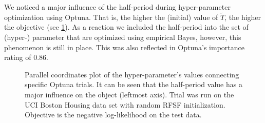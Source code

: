 We noticed a major influence of the half-period during hyper-parameter optimization using Optuna\cite{akibaOptunaNextgenerationHyperparameter2019}.
That is, the higher the (initial) value of \(\tilde{T}\), the higher the objective (see \cref{fig:optunaParallelCoordinates}).
As a reaction we included the half-period into the set of (hyper-) parameter that are optimized using empirical Bayes, however, this phenomenon is still in place.
This was also reflected in Optuna's importance rating of \num{0.86}.

\begin{figure}
	\centering
	\resizebox{\linewidth}{!}{}
	\caption{
		Parallel coordinates plot of the hyper-parameter's values connecting specific Optuna\cite{akibaOptunaNextgenerationHyperparameter2019} trials.
		It can be seen that the half-period value has a major influence on the object (leftmost axis).
		Trial was run on the UCI\cite{duaUCIMachineLearning2017} Boston Housing data set with random \ac{RFSF} initialization.
		Objective is the negative log-likelihood on the test data.
	}
	\label{fig:optunaParallelCoordinates}
\end{figure}
